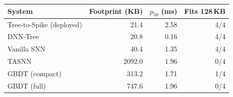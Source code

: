 \begin{tabular}{lrrr}
\toprule
System & Footprint (KB) & $p_{50}$ (ms) & Fits 128\,KB \\
\midrule
Tree-to-Spike (deployed) & 21.4 & 2.58 & 4/4 \\
DNN-Tree & 20.8 & 0.16 & 4/4 \\
Vanilla SNN & 40.4 & 1.35 & 4/4 \\
TASNN & 2092.0 & 1.96 & 0/4 \\
GBDT (compact) & 313.2 & 1.71 & 1/4 \\
GBDT (full) & 747.6 & 1.96 & 0/4 \\
\bottomrule
\end{tabular}
